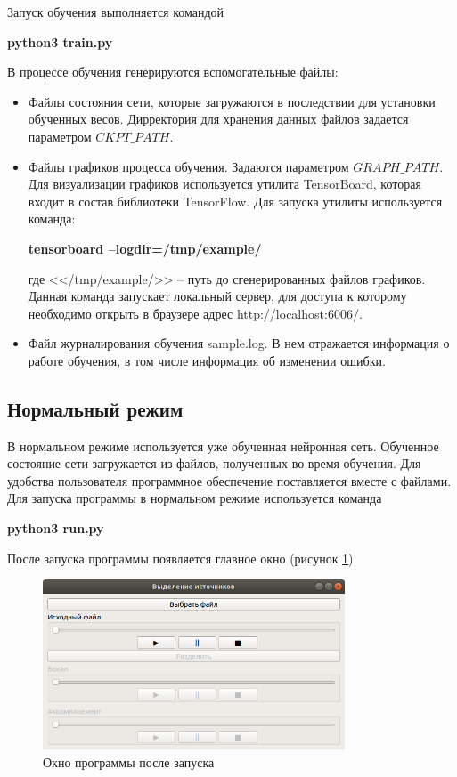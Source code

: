 Запуск обучения выполняется командой

\textbf{python3 train.py}

В процессе обучения генерируются вспомогательные файлы:
\begin{itemize}
	\item Файлы состояния сети, которые загружаются в последствии для установки обученных весов. Дирректория для хранения данных файлов задается параметром $CKPT\_PATH$.
	\item Файлы графиков процесса обучения. Задаются параметром $GRAPH\_PATH$. Для визуализации графиков используется утилита TensorBoard, которая входит в состав библиотеки TensorFlow. Для запуска утилиты используется команда:
	
	\textbf{tensorboard --logdir=/tmp/example/}
	
	где <</tmp/example/>> -- путь до сгенерированных файлов графиков. Данная команда запускает локальный сервер, для доступа к которому необходимо открыть в браузере адрес http://localhost:6006/.
	
	\item Файл журналирования обучения sample.log. В нем отражается информация о работе обучения, в том числе информация об изменении ошибки.
	
\end{itemize}
 
\subsection{Нормальный режим}

В нормальном режиме используется уже обученная нейронная сеть. Обученное состояние сети загружается из файлов, полученных во время обучения. Для удобства пользователя программное обеспечение поставляется вместе с файлами. Для запуска программы в нормальном режиме используется команда

\textbf{python3 run.py}

После запуска программы появляется главное окно (рисунок \ref{imp:main-window})

\begin{figure}
	\centering
	\includegraphics[width=0.8\textwidth]{inc/img/prog-main}
	\caption{Окно программы после запуска}
	\label{imp:main-window}
\end{figure}

